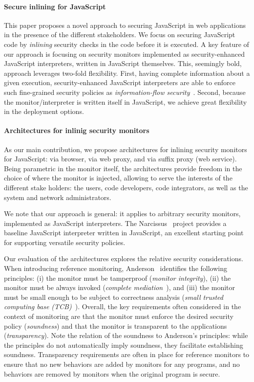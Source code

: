 \documentclass{llncs}
\begin{document}
\paragraph{Secure inlining for JavaScript}
This paper proposes a novel approach to securing JavaScript in web
applications in the presence of the different stakeholders.
%
We focus on securing JavaScript code by \emph{inlining}
security checks in the code before it is executed.
%
A key feature
of our approach is focusing on security monitors implemented as
security-enhanced JavaScript interpreters, written in JavaScript
themselves. This, seemingly bold, approach leverages two-fold
flexibility. First, having complete information about a given
execution, security-enhanced JavaScript interpreters are able to
enforce such fine-grained security policies as \emph{information-flow
security}~\cite{Sabelfeld:Myers:JSAC}. Second, because the monitor/interpreter is written itself in
JavaScript, we achieve great flexibility in the deployment options.

\paragraph{Architectures for inlinig security monitors}
As our main contribution,
we propose architectures for inlining security monitors for JavaScript: via
browser, via web proxy, and via suffix proxy (web service). 
%
Being parametric in the monitor itself,
the architectures provide freedom in the choice of where the monitor is
injected, allowing to serve the interests of the different stake
holders: the users, code developers, code
integrators, as well as the system and network administrators.

We note that our approach is general: it applies to arbitrary security
monitors, implemented as JavaScript interpreters. The 
 Narcissus~\cite{Narcissus} project provides a baseline JavaScript
 interpreter written in JavaScript, an excellent starting
 point for supporting versatile security policies.

Our evaluation of the architectures explores the relative security
considerations.
When introducing reference monitoring, Anderson~\cite{Anderson:72}
identifies the following principles:
(i) the monitor must be tamperproof (\emph{monitor integrity}),
(ii) the monitor must be always invoked (\emph{complete
  mediation}~\cite{Saltzer:Schroeder:TCB}), and
(iii) the monitor must be small enough to be subject to correctness
analysis (\emph{small trusted computing base
  (TCB)}~\cite{Saltzer:Schroeder:TCB,DBLP:dblp_conf/sosp/Rushby81}). Overall,
the key requirements often considered in the context of monitoring are 
that the monitor must enforce the desired security policy
(\emph{soundness}) and that the monitor is transparent to the
applications (\emph{transparency}). Note the relation of
the soundness to Anderson's principles: while the principles do not
automatically imply soundness, they facilitate establishing soundness. 
Transparency requirements are often in place for reference monitors to
ensure that no new behaviors are added by monitors for any programs, and no
behaviors are removed by monitors when the
original program is secure.
\end{document}
